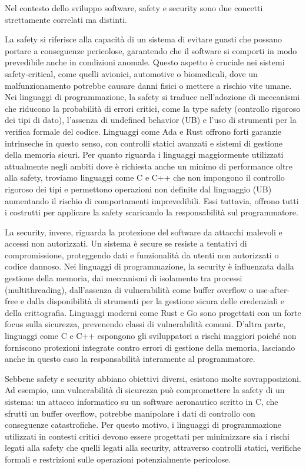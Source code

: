 Nel contesto dello sviluppo software, safety e security sono due concetti strettamente correlati ma distinti.

La safety si riferisce alla capacità di un sistema di evitare guasti che possano portare a conseguenze pericolose, garantendo che il software si comporti in modo prevedibile anche in condizioni anomale. Questo aspetto è cruciale nei sistemi safety-critical, come quelli avionici, automotive o biomedicali, dove un malfunzionamento potrebbe causare danni fisici o mettere a rischio vite umane.
Nei linguaggi di programmazione, la safety si traduce nell’adozione di meccanismi che riducono la probabilità di errori critici, come la type safety (controllo rigoroso dei tipi di dato), l’assenza di undefined behavior (UB) e l’uso di strumenti per la verifica formale del codice. Linguaggi come Ada e Rust offrono forti garanzie intrinseche in questo senso, con controlli statici avanzati e sistemi di gestione della memoria sicuri. Per quanto riguarda i linguaggi maggiormente utilizzati attualmente negli ambiti dove è richiesta anche un minimo di performance oltre alla safety, troviamo linguaggi come C e C++ che non impongono il controllo rigoroso dei tipi e permettono operazioni non definite dal linguaggio (UB) aumentando il rischio di comportamenti imprevedibili. Essi tuttavia, offrono tutti i costrutti per applicare la safety scaricando la responsabilità sul programmatore.

La security, invece, riguarda la protezione del software da attacchi malevoli e accessi non autorizzati. Un sistema è secure se resiste a tentativi di compromissione, proteggendo dati e funzionalità da utenti non autorizzati o codice dannoso.
Nei linguaggi di programmazione, la security è influenzata dalla gestione della memoria, dai meccanismi di isolamento tra processi (multithreading), dall’assenza di vulnerabilità come buffer overflow o use-after-free e dalla disponibilità di strumenti per la gestione sicura delle credenziali e della crittografia. Linguaggi moderni come Rust e Go sono progettati con un forte focus sulla sicurezza, prevenendo classi di vulnerabilità comuni. D'altra parte, linguaggi come C e C++ espongono gli sviluppatori a rischi maggiori poiché non forniscono protezioni integrate contro errori di gestione della memoria, lasciando anche in questo caso la responsabilità interamente al programmatore.

Sebbene safety e security abbiano obiettivi diversi, esistono molte sovrapposizioni.
Ad esempio, una vulnerabilità di sicurezza può compromettere la safety di un sistema: un attacco informatico su un software aeronautico scritto in C, che sfrutti un buffer overflow, potrebbe manipolare i dati di controllo con conseguenze catastrofiche. Per questo motivo, i linguaggi di programmazione utilizzati in contesti critici devono essere progettati per minimizzare sia i rischi legati alla safety che quelli legati alla security, attraverso controlli statici, verifiche formali e restrizioni sulle operazioni potenzialmente pericolose.